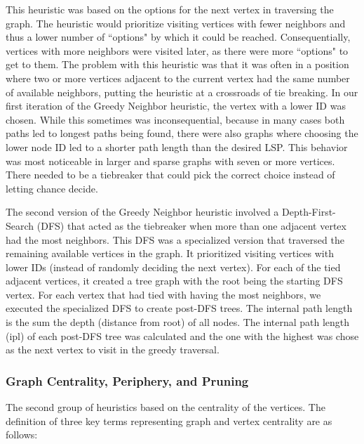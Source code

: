\documentclass[twocolumn,showpacs,%
  nofootinbib,aps,superscriptaddress,%
  eqsecnum,prd,notitlepage,showkeys,11pt]{article}
\begin{document}
This heuristic was based on the options for the next vertex in traversing the graph. The heuristic would prioritize visiting vertices with fewer neighbors and thus a lower number of ``options" by which it could be reached. Consequentially, vertices with more neighbors were visited later, as there were more ``options" to get to them. The problem with this heuristic was that it was often in a position where two or more vertices adjacent to the current vertex had the same number of available neighbors, putting the heuristic at a crossroads of tie breaking. In our first iteration of the Greedy Neighbor heuristic, the vertex with a lower ID was chosen. While this sometimes was inconsequential, because in many cases both paths led to longest paths being found, there were also graphs where choosing the lower node ID led to a shorter path length than the desired LSP. This behavior was most noticeable in larger and sparse graphs with seven or more vertices. There needed to be a tiebreaker that could pick the correct choice instead of letting chance decide. 

The second version of the Greedy Neighbor heuristic involved a Depth-First-Search (DFS) that acted as the tiebreaker when more than one adjacent vertex had the most neighbors. This DFS was a specialized version that traversed the remaining available vertices in the graph. It prioritized visiting vertices with lower IDs (instead of randomly deciding the next vertex). For each of the tied adjacent vertices, it created a tree graph with the root being the starting DFS vertex. For each vertex that had tied with having the most neighbors, we executed the specialized DFS to create post-DFS trees. The internal path length is the sum the depth (distance from root) of all nodes. The internal path length (ipl) of each post-DFS tree was calculated and the one with the highest was chose as the next vertex to visit in the greedy traversal. 

\subsubsection{Graph Centrality, Periphery, and Pruning}
The second group of heuristics based on the centrality of the vertices. The definition of three key terms representing graph and vertex centrality are as follows: 
\end{document}
